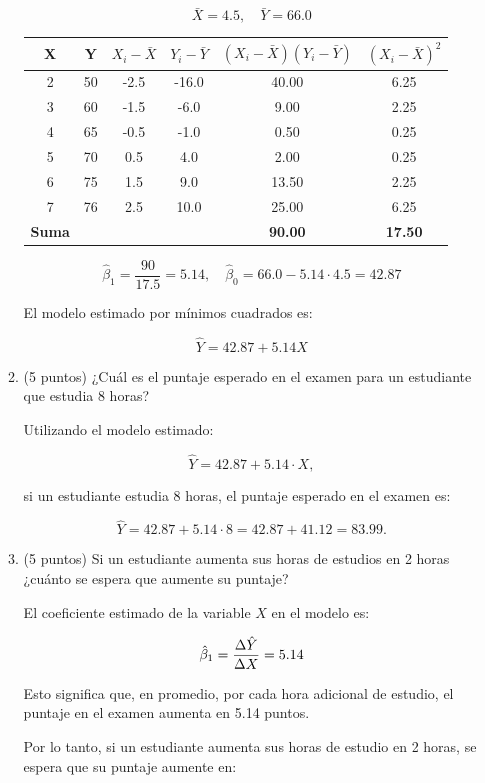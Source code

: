 \documentclass[10pt,a4paper]{article}
\begin{document}
\begin{enumerate}
\begin{enumerate}
    {\color{blue} \[
\bar{X} = 4.5, \quad \bar{Y} = 66.0
\]

\begin{center}
\begin{tabular}{|c|c|c|c|c|c|}
\hline
\textbf{X} & \textbf{Y} & \(X_i - \bar{X}\) & \(Y_i - \bar{Y}\) & \((X_i - \bar{X})(Y_i - \bar{Y})\) & \((X_i - \bar{X})^2\) \\
\hline
2 & 50 & -2.5 & -16.0 & 40.00 & 6.25 \\
3 & 60 & -1.5 & -6.0  & 9.00  & 2.25 \\
4 & 65 & -0.5 & -1.0  & 0.50  & 0.25 \\
5 & 70 & 0.5  & 4.0   & 2.00  & 0.25 \\
6 & 75 & 1.5  & 9.0   & 13.50 & 2.25 \\
7 & 76 & 2.5  & 10.0  & 25.00 & 6.25 \\
\hline
\textbf{Suma} & & & & \textbf{90.00} & \textbf{17.50} \\
\hline
\end{tabular}
\end{center}


\[
\hat{\beta}_1 = \frac{90}{17.5} = 5.14, \quad \hat{\beta}_0 = 66.0 - 5.14 \cdot 4.5 = 42.87
\]

El modelo estimado por mínimos cuadrados es:

\[
\hat{Y} = 42.87 + 5.14X
\]
}
   \item (5 puntos) ¿Cu\'al es el puntaje esperado en el examen para un estudiante que estudia 8 horas?

   {\color{blue} Utilizando el modelo estimado:

\[
\hat{Y} = 42.87 + 5.14 \cdot X,
\]

si un estudiante estudia 8 horas, el puntaje esperado en el examen es:

\[
\hat{Y} = 42.87 + 5.14 \cdot 8 = 42.87 + 41.12 = 83.99.
\]}
\item (5 puntos) Si un estudiante aumenta sus horas de estudios en 2 horas ¿cu\'anto se espera que aumente su puntaje?

{\color{blue} El coeficiente estimado de la variable \(X\) en el modelo es:

\[
\hat{\beta}_1 = {\Delta \hat{Y}\over \Delta X} =5.14
\]

Esto significa que, en promedio, por cada hora adicional de estudio, el puntaje en el examen aumenta en 5.14 puntos.

Por lo tanto, si un estudiante aumenta sus horas de estudio en 2 horas, se espera que su puntaje aumente en:

}
\end{enumerate}
\end{enumerate}
\end{document}
